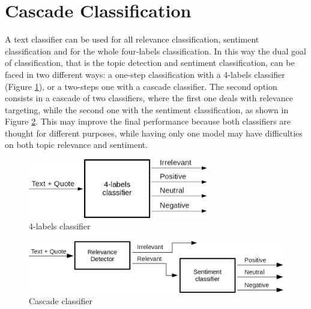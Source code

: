 \section{Cascade Classification}

A text classifier can be used for all relevance classification, sentiment classification and for the whole four-labels classification. In this way the dual goal of classification, that is the topic detection and sentiment classification, can be faced in two different ways: a one-step classification with a 4-labels classifier (Figure \ref{fig:4label-class}), or a two-steps one with a cascade classifier. The second option consists in a cascade of two classifiers, where the first one deals with relevance targeting, while the second one with the sentiment classification, as shown in Figure \ref{fig:cascade-class}. This may improve the final performance because both classifiers are thought for different purposes, while having only one model may have difficulties on both topic relevance and sentiment.


\begin{figure}[ht]
	\centering
	\includegraphics[width=0.7\textwidth]{figures/blocks_class.png}
	\caption{4-labels classifier}
	\label{fig:4label-class}
\end{figure}

\begin{figure}[ht]
	\centering
	\includegraphics[width=1\textwidth]{figures/blocks_cascade.png}
	\caption{Cascade classifier}
	\label{fig:cascade-class}
\end{figure}














